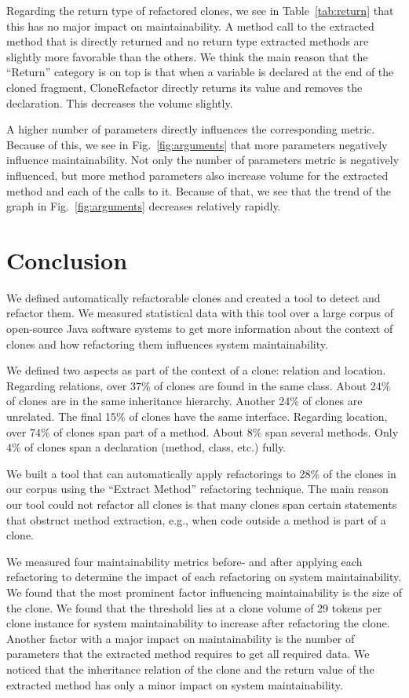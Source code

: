 \documentclass[sigconf,review, table]{acmart}
\begin{document}
Regarding the return type of refactored clones, we see in Table~\ref{tab:return} that this has no major impact on maintainability. A method call to the extracted method that is directly returned and no return type extracted methods are slightly more favorable than the others. We think the main reason that the ``Return'' category is on top is that when a variable is declared at the end of the cloned fragment, CloneRefactor directly returns its value and removes the declaration. This decreases the volume slightly.

A higher number of parameters directly influences the corresponding metric. Because of this, we see in Fig.~\ref{fig:arguments} that more parameters negatively influence maintainability. Not only the number of parameters metric is negatively influenced, but more method parameters also increase volume for the extracted method and each of the calls to it. Because of that, we see that the trend of the graph in Fig.~\ref{fig:arguments} decreases relatively rapidly.

\section{Conclusion}
We defined automatically refactorable clones and created a tool to detect and refactor them. We measured statistical data with this tool over a large corpus of open-source Java software systems to get more information about the context of clones and how refactoring them influences system maintainability.

We defined two aspects as part of the context of a clone: relation and location. Regarding relations, over 37\% of clones are found in the same class. About 24\% of clones are in the same inheritance hierarchy. Another 24\% of clones are unrelated. The final 15\% of clones have the same interface. Regarding location, over 74\% of clones span part of a method. About 8\% span several methods. Only 4\% of clones span a declaration (method, class, etc.) fully.

We built a tool that can automatically apply refactorings to 28\% of the clones in our corpus using the ``Extract Method'' refactoring technique. The main reason our tool could not refactor all clones is that many clones span certain statements that obstruct method extraction, e.g., when code outside a method is part of a clone.

We measured four maintainability metrics before- and after applying each refactoring to determine the impact of each refactoring on system maintainability. We found that the most prominent factor influencing maintainability is the size of the clone. We found that the threshold lies at a clone volume of 29 tokens per clone instance for system maintainability to increase after refactoring the clone. Another factor with a major impact on maintainability is the number of parameters that the extracted method requires to get all required data. We noticed that the inheritance relation of the clone and the return value of the extracted method has only a minor impact on system maintainability.
\end{document}
